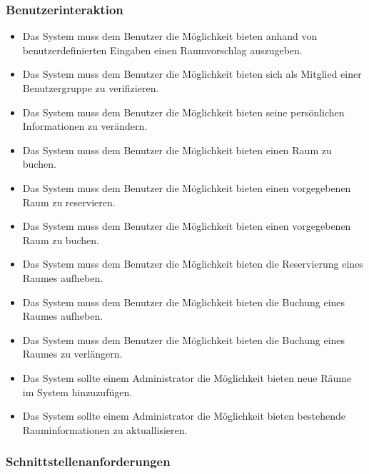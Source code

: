 \subsubsection{Benutzerinteraktion}
\label{sec:Benutzerinteraktion}

\begin{itemize}
	\item Das System muss dem Benutzer die Möglichkeit bieten anhand von benutzerdefinierten Eingaben einen Raumvorschlag auszugeben.
	\item Das System muss dem Benutzer die Möglichkeit bieten sich als Mitglied einer Benutzergruppe zu verifizieren.
	\item Das System muss dem Benutzer die Möglichkeit bieten seine persönlichen Informationen zu verändern.
	\item Das System muss dem Benutzer die Möglichkeit bieten einen Raum zu buchen.
	\item Das System muss dem Benutzer die Möglichkeit bieten einen vorgegebenen Raum zu reservieren.
	\item Das System muss dem Benutzer die Möglichkeit bieten einen vorgegebenen Raum zu buchen.
	\item Das System muss dem Benutzer die Möglichkeit bieten die Reservierung eines Raumes aufheben.
	\item Das System muss dem Benutzer die Möglichkeit bieten die Buchung eines Raumes aufheben.
	\item Das System muss dem Benutzer die Möglichkeit bieten die Buchung eines Raumes zu verlängern.
	\item Das System sollte einem Administrator die Möglichkeit bieten neue Räume im System hinzuzufügen.
	\item Das System sollte einem Administrator die Möglichkeit bieten bestehende Rauminformationen zu aktuallisieren.
\end{itemize}

\subsubsection{Schnittstellenanforderungen}
\label{sec:Schnittstellenanforderungen}

